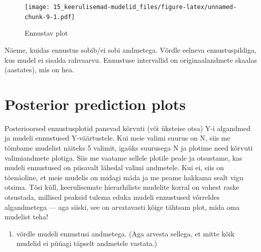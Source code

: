 \documentclass[]{book}
\newenvironment{Shaded}{\begin{snugshade}}{\end{snugshade}}
\newcommand{\KeywordTok}[1]{\textcolor[rgb]{0.13,0.29,0.53}{\textbf{#1}}}
\newcommand{\DecValTok}[1]{\textcolor[rgb]{0.00,0.00,0.81}{#1}}
\newcommand{\StringTok}[1]{\textcolor[rgb]{0.31,0.60,0.02}{#1}}
\newcommand{\CommentTok}[1]{\textcolor[rgb]{0.56,0.35,0.01}{\textit{#1}}}
\newcommand{\OperatorTok}[1]{\textcolor[rgb]{0.81,0.36,0.00}{\textbf{#1}}}
\newcommand{\NormalTok}[1]{#1}
\providecommand{\tightlist}{%
  \setlength{\itemsep}{0pt}\setlength{\parskip}{0pt}}
\begin{document}
\begin{figure}
\centering
\texttt{[image: 15\_keerulisemad-mudelid\_files/figure-latex/unnamed-chunk-9-1.pdf]}
\caption{\label{fig:unnamed-chunk-9}Ennustav plot}
\end{figure}

Näeme, kuidas ennustus sobib/ei sobi andmetega. Võrdle eelneva
ennustuspildiga, kus mudel ei sisalda rahvaarvu. Ennustuse intervallid
on originaalandmete skaalas (aastates), mis on hea.

\section*{Posterior prediction plots}\label{posterior-prediction-plots}

Posterioorsed ennustusplotid panevad kõrvuti (või üksteise otsa) Y-i
algandmed ja mudeli ennustused Y-väärtustele. Kui meie valimi suurus on
N, siis me tõmbame mudelist näiteks 5 valimit, igaüks suurusega N ja
plotime need kõrvuti valimiandmete plotiga. Siis me vaatame sellele
plotile peale ja otsustame, kas mudeli ennustused on piisavalt lähedal
valimi andmetele. Kui ei, siis on tõenäoline, et meie mudelis on midagi
mäda ja me peame hakkama sealt vigu otsima. Tõsi küll, keerulisemate
hierarhiliste mudelite korral on vahest raske otsustada, millised
peaksid tulema eduka mudeli ennustused võrreldes algandmetega --- aga
siiski, see on arvatavasti kõige tähtsam plot, mida oma mudelist teha!

\begin{enumerate}
\def\labelenumi{\arabic{enumi})}
\tightlist
\item
  võrdle mudeli ennustusi andmetega. (Aga arvesta sellega, et mitte kõik
  mudelid ei püüagi täpselt andmetele vastata.)
\end{enumerate}

\begin{Shaded}
\end{Shaded}
\end{document}

